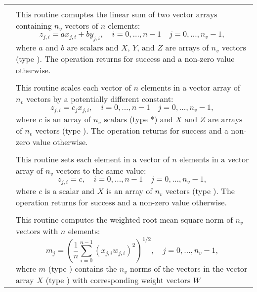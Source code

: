 \begin{xtabular}{|p{\colonec}|p{\coltwoc}|}
 &  \\
& This routine comuptes the linear sum of two vector arrays containing $n_v$
vectors of $n$ elements:
\begin{equation*}
z_{j,i} = a x_{j,i} + b y_{j,i}, \quad i=0,\ldots,n-1 \quad j=0,\ldots,n_v-1,
\end{equation*}
where $a$ and $b$ are  scalars and $X$, $Y$, and $Z$ are arrays of
$n_v$ vectors (type ). The operation returns  for success and
a non-zero value otherwise.
\\[2mm]
 &  \\
& This routine scales each vector of $n$ elements in a vector array of $n_v$
vectors by a potentially different constant:
\begin{equation*}
z_{j,i} = c_j x_{j,i}, \quad i=0,\ldots,n-1 \quad j=0,\ldots,n_v-1,
\end{equation*}
where $c$ is an array of $n_v$ scalars (type *) and $X$ and $Z$ are
arrays of $n_v$ vectors (type ). The operation returns  for
success and a non-zero value otherwise.
\\[2mm]
 &  \\
& This routine sets each element in a vector of $n$ elements in a vector array of
$n_v$ vectors to the same value:
\begin{equation*}
z_{j,i} = c, \quad i=0,\ldots,n-1 \quad j=0,\ldots,n_v-1,
\end{equation*}
where $c$ is a  scalar and $X$ is an array of $n_v$ vectors (type
). The operation returns  for success and a non-zero value
otherwise.
\\[2mm]
 &  \\
& This routine computes the weighted root mean square norm of $n_v$ vectors with
$n$ elements:
\begin{equation*}
m_j = \left( \frac1n \sum_{i=0}^{n-1} \left(x_{j,i} w_{j,i}\right)^2\right)^{1/2}, \quad j=0,\ldots,n_v-1,
\end{equation*}
where $m$ (type ) contains the $n_v$ norms of the vectors in the
vector array $X$ (type ) with corresponding weight vectors $W$

\end{xtabular}

